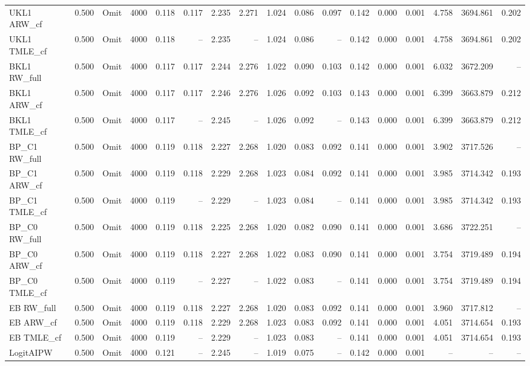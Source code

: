\begin{tabular}{llllrrrrrrrrrrrrr}
UKL1 ARW\_cf & 0.500 & Omit & 4000 & 0.118 & 0.117 & 2.235 & 2.271 & 1.024 & 0.086 & 0.097 & 0.142 & 0.000 & 0.001 & 4.758 & 3694.861 & 0.202 \\
UKL1 TMLE\_cf & 0.500 & Omit & 4000 & 0.118 & -- & 2.235 & -- & 1.024 & 0.086 & -- & 0.142 & 0.000 & 0.001 & 4.758 & 3694.861 & 0.202 \\
BKL1 RW\_full & 0.500 & Omit & 4000 & 0.117 & 0.117 & 2.244 & 2.276 & 1.022 & 0.090 & 0.103 & 0.142 & 0.000 & 0.001 & 6.032 & 3672.209 & -- \\
BKL1 ARW\_cf & 0.500 & Omit & 4000 & 0.117 & 0.117 & 2.246 & 2.276 & 1.026 & 0.092 & 0.103 & 0.143 & 0.000 & 0.001 & 6.399 & 3663.879 & 0.212 \\
BKL1 TMLE\_cf & 0.500 & Omit & 4000 & 0.117 & -- & 2.245 & -- & 1.026 & 0.092 & -- & 0.143 & 0.000 & 0.001 & 6.399 & 3663.879 & 0.212 \\
BP\_C1 RW\_full & 0.500 & Omit & 4000 & 0.119 & 0.118 & 2.227 & 2.268 & 1.020 & 0.083 & 0.092 & 0.141 & 0.000 & 0.001 & 3.902 & 3717.526 & -- \\
BP\_C1 ARW\_cf & 0.500 & Omit & 4000 & 0.119 & 0.118 & 2.229 & 2.268 & 1.023 & 0.084 & 0.092 & 0.141 & 0.000 & 0.001 & 3.985 & 3714.342 & 0.193 \\
BP\_C1 TMLE\_cf & 0.500 & Omit & 4000 & 0.119 & -- & 2.229 & -- & 1.023 & 0.084 & -- & 0.141 & 0.000 & 0.001 & 3.985 & 3714.342 & 0.193 \\
BP\_C0 RW\_full & 0.500 & Omit & 4000 & 0.119 & 0.118 & 2.225 & 2.268 & 1.020 & 0.082 & 0.090 & 0.141 & 0.000 & 0.001 & 3.686 & 3722.251 & -- \\
BP\_C0 ARW\_cf & 0.500 & Omit & 4000 & 0.119 & 0.118 & 2.227 & 2.268 & 1.022 & 0.083 & 0.090 & 0.141 & 0.000 & 0.001 & 3.754 & 3719.489 & 0.194 \\
BP\_C0 TMLE\_cf & 0.500 & Omit & 4000 & 0.119 & -- & 2.227 & -- & 1.022 & 0.083 & -- & 0.141 & 0.000 & 0.001 & 3.754 & 3719.489 & 0.194 \\
EB RW\_full & 0.500 & Omit & 4000 & 0.119 & 0.118 & 2.227 & 2.268 & 1.020 & 0.083 & 0.092 & 0.141 & 0.000 & 0.001 & 3.960 & 3717.812 & -- \\
EB ARW\_cf & 0.500 & Omit & 4000 & 0.119 & 0.118 & 2.229 & 2.268 & 1.023 & 0.083 & 0.092 & 0.141 & 0.000 & 0.001 & 4.051 & 3714.654 & 0.193 \\
EB TMLE\_cf & 0.500 & Omit & 4000 & 0.119 & -- & 2.229 & -- & 1.023 & 0.083 & -- & 0.141 & 0.000 & 0.001 & 4.051 & 3714.654 & 0.193 \\
LogitAIPW & 0.500 & Omit & 4000 & 0.121 & -- & 2.245 & -- & 1.019 & 0.075 & -- & 0.142 & 0.000 & 0.001 & -- & -- & -- \\

\end{tabular}
